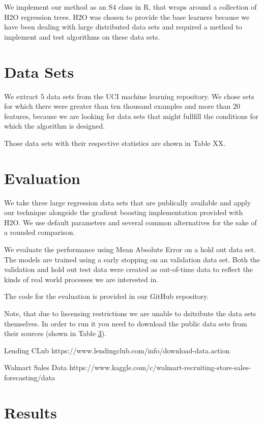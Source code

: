 \documentclass[11pt,twoside,a4paper]{article}
\begin{document}
We implement our method as an S4 class in R, that wraps around a collection of H2O regression trees.
H2O was chosen to provide the base learners because we have been dealing with large distributed data 
sets and required a method to implement and test algorithms on these data sets.

\section{Data Sets}

We extract 5 data sets from the UCI machine learning repository. We chose sets for which there were greater than ten thousand
examples and more than 20 features, because we are looking for data sets that might fullfill the conditions for which the
algorithm is designed. 

Those data sets with their respective statistics are shown in Table XX.

  

\section{Evaluation}

We take three large regression data sets that are publically available 
and apply our technique alongside the gradient boosting implementation
provided with H2O. We use default parameters and several common alternatives
for the sake of a rounded comparison. 

We evaluate the performance using Mean Absolute Error on a hold out data set.
The models are trained using a early stopping on an validation data set. Both
the validation and hold out test data were created as out-of-time data to reflect
the kinds of real world processes we are interested in. 

The code for the evaluation is provided in our GitHub repository. 


Note, that due to liscensing restrictions we are unable to dsitribute the data sets
themselves. In order to run
it you need to download the public data sets from their sources (shown in Table \ref{}).

Lending CLub
https://www.lendingclub.com/info/download-data.action

Walmart Sales Data
https://www.kaggle.com/c/walmart-recruiting-store-sales-forecasting/data


\section{Results}
\end{document}

